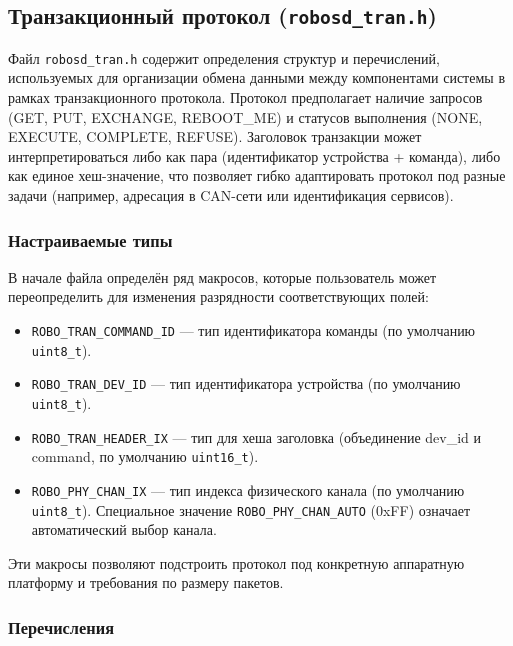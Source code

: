 \documentclass[a4paper,12pt]{article}
\begin{document}
\subsection{Транзакционный протокол (\texttt{robosd\_tran.h})}

Файл \texttt{robosd\_tran.h} содержит определения структур и перечислений, используемых для организации обмена данными между компонентами системы в рамках транзакционного протокола. Протокол предполагает наличие запросов (GET, PUT, EXCHANGE, REBOOT\_ME) и статусов выполнения (NONE, EXECUTE, COMPLETE, REFUSE). Заголовок транзакции может интерпретироваться либо как пара (идентификатор устройства + команда), либо как единое хеш-значение, что позволяет гибко адаптировать протокол под разные задачи (например, адресация в CAN-сети или идентификация сервисов).

\subsubsection{Настраиваемые типы}

В начале файла определён ряд макросов, которые пользователь может переопределить для изменения разрядности соответствующих полей:

\begin{itemize}
    \item \texttt{ROBO\_TRAN\_COMMAND\_ID} — тип идентификатора команды (по умолчанию \texttt{uint8\_t}).
    \item \texttt{ROBO\_TRAN\_DEV\_ID} — тип идентификатора устройства (по умолчанию \texttt{uint8\_t}).
    \item \texttt{ROBO\_TRAN\_HEADER\_IX} — тип для хеша заголовка (объединение dev\_id и command, по умолчанию \texttt{uint16\_t}).
    \item \texttt{ROBO\_PHY\_CHAN\_IX} — тип индекса физического канала (по умолчанию \texttt{uint8\_t}). Специальное значение \texttt{ROBO\_PHY\_CHAN\_AUTO} (0xFF) означает автоматический выбор канала.
\end{itemize}

Эти макросы позволяют подстроить протокол под конкретную аппаратную платформу и требования по размеру пакетов.

\subsubsection{Перечисления}
\end{document}
